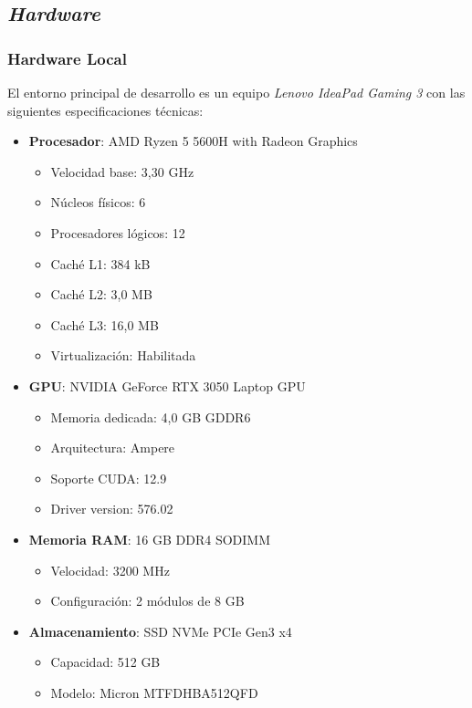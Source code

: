 \documentclass[12pt,a4paper,onecolumn,oneside]{report}
\begin{document}
\subsection{\textit{Hardware}}
\subsubsection{Hardware Local}
El entorno principal de desarrollo es un equipo \textit{Lenovo IdeaPad Gaming 3} con las siguientes especificaciones técnicas:

\begin{itemize}
    \item \textbf{Procesador}: AMD Ryzen 5 5600H with Radeon Graphics
    \begin{itemize}
        \item Velocidad base: 3,30 GHz
        \item Núcleos físicos: 6
        \item Procesadores lógicos: 12
        \item Caché L1: 384 kB
        \item Caché L2: 3,0 MB  
        \item Caché L3: 16,0 MB
        \item Virtualización: Habilitada
    \end{itemize}
    
    \item \textbf{GPU}: NVIDIA GeForce RTX 3050 Laptop GPU
    \begin{itemize}
        \item Memoria dedicada: 4,0 GB GDDR6
        \item Arquitectura: Ampere
        \item Soporte CUDA: 12.9
        \item Driver version: 576.02
    \end{itemize}
    
    \item \textbf{Memoria RAM}: 16 GB DDR4 SODIMM
    \begin{itemize}
        \item Velocidad: 3200 MHz
        \item Configuración: 2 módulos de 8 GB
    \end{itemize}
    
    \item \textbf{Almacenamiento}: SSD NVMe PCIe Gen3 x4
    \begin{itemize}
        \item Capacidad: 512 GB
        \item Modelo: Micron MTFDHBA512QFD
    \end{itemize}
\end{itemize}
\end{document}
